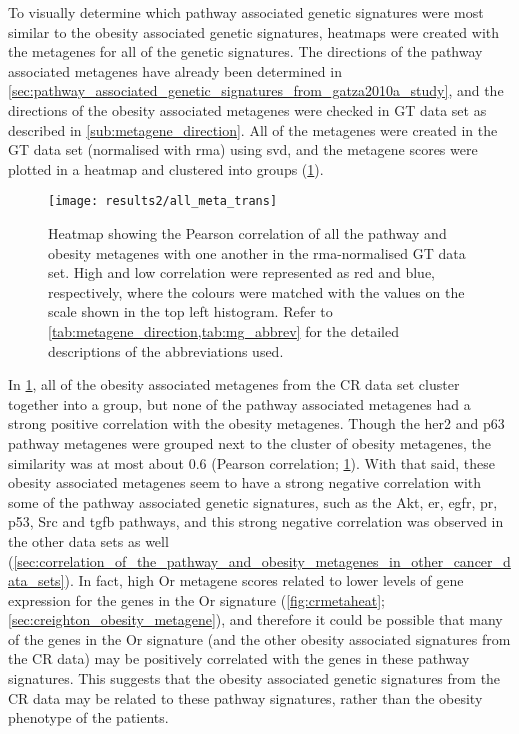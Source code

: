 To visually determine which pathway associated genetic signatures were most similar to the obesity associated genetic signatures, heatmaps were created with the metagenes for all of the genetic signatures.
The directions of the pathway associated metagenes have already been determined in \cref{sec:pathway_associated_genetic_signatures_from_gatza2010a_study}, and the directions of the obesity associated metagenes were checked in GT data set as described in \cref{sub:metagene_direction}.
All of the metagenes were created in the GT data set (normalised with \gls{rma}) using \gls{svd}, and the metagene scores were plotted in a heatmap and clustered into groups (\cref{fig:gatza_allmeta}).

\begin{figure}[tb]
	\centering
	\texttt{[image: results2/all\_meta\_trans]}
	\caption[Heatmap of the Pearson correlation of all the pathway and obesity metagenes with one another in the \acrshort{rma}-normalised GT data]{Heatmap showing the Pearson correlation of all the pathway and obesity metagenes  with one another  in the \gls{rma}-normalised GT data set.
		High and low correlation were represented as red and blue, respectively, where the colours were matched with the values on the scale shown in the top left histogram.
		Refer to \cref{tab:metagene_direction,tab:mg_abbrev} for the detailed descriptions of the abbreviations used.
		}
	\label{fig:gatza_allmeta}
\end{figure}

In \cref{fig:gatza_allmeta}, all of the obesity associated metagenes from the CR data set cluster together into a group, but none of the pathway associated metagenes had  a strong positive correlation with the obesity metagenes.
Though the  \gls{her2} and p63 pathway metagenes were grouped next to the cluster of obesity metagenes, the similarity was at most about 0.6  (Pearson correlation; \cref{fig:gatza_allmeta}).
With that said, these obesity associated metagenes seem to have a strong negative correlation with some of the pathway associated genetic signatures, such as the Akt, \gls{er}, \gls{egfr}, \gls{pr}, p53, Src and \gls{tgfb} pathways, and this strong negative correlation was observed in the other data sets as well (\cref{sec:correlation_of_the_pathway_and_obesity_metagenes_in_other_cancer_data_sets}).
In fact,  high Or metagene scores related to lower levels of gene expression for the genes in the Or signature (\cref{fig:crmetaheat}; \cref{sec:creighton_obesity_metagene}), and therefore it could be possible that many of the genes in the Or signature (and the other obesity associated signatures from the CR data) may be positively correlated with the genes in these pathway signatures.
This suggests that the obesity associated genetic signatures from the CR data may be related to these pathway signatures, rather than the obesity phenotype of the patients.


